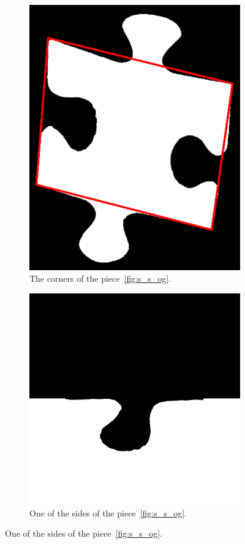 \documentclass{article}
\begin{document}
\begin{figure}
\begin{subfigure}{0.3\textwidth}
    \includegraphics[width=\linewidth]{pictures/corners_found.png}
    \caption{The corners of the piece~\cref{fig:s_s_og}.}
    \label{fig:s_s_corners_found}
  \end{subfigure}
  \hfill
  \begin{subfigure}{0.3\textwidth}
    \centering
    \includegraphics[width=\linewidth]{pictures/piece_side.png}
    \caption{One of the sides of the piece~\cref{fig:s_s_og}.}
    \label{fig:s_s_a_piece_side}
  \end{subfigure}
  

\end{figure}
\end{document}
